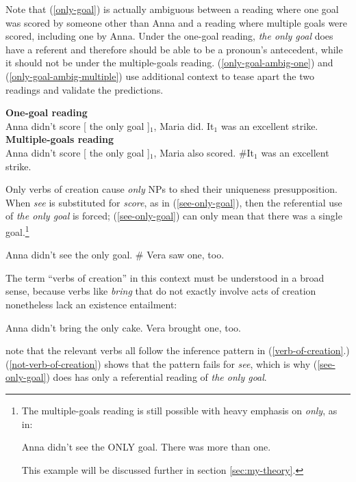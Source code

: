 Note that (\ref{only-goal}) is actually ambiguous between a reading where one goal was scored by someone other than Anna and a reading where multiple goals were scored, including one by Anna. Under the one-goal reading, \textit{the only goal} does have a referent and therefore should be able to be a pronoun's antecedent, while it should not be under the multiple-goals reading. (\ref{only-goal-ambig-one}) and (\ref{only-goal-ambig-multiple}) use additional context to tease apart the two readings and validate the predictions.

\begin{exe}
	\ex \label{only-goal-ambig-one} \textbf{One-goal reading} \\ Anna didn't score [ the only goal ]$_1$, Maria did. It$_1$ was an excellent strike.
	\ex \label{only-goal-ambig-multiple} \textbf{Multiple-goals reading} \\ Anna didn't score [ the only goal ]$_1$, Maria also scored. \#It$_1$ was an excellent strike.
\end{exe}

Only verbs of creation cause \textit{only} NPs to shed their uniqueness presupposition. When \textit{see} is substituted for \textit{score}, as in (\ref{see-only-goal}), then the referential use of \textit{the only goal} is forced; (\ref{see-only-goal}) can only mean that there was a single goal.\footnote{The multiple-goals reading is still possible with heavy emphasis on \textit{only}, as in: \begin{exe} \ex Anna didn't see the ONLY goal. There was more than one. \end{exe} This example will be discussed further in section \ref{sec:my-theory}.}

\begin{exe}
	\ex \label{see-only-goal} Anna didn't see the only goal. \# Vera saw one, too.
\end{exe}

The term ``verbs of creation'' in this context must be understood in a broad sense, because verbs like \textit{bring} that do not exactly involve acts of creation nonetheless lack an existence entailment:

\begin{exe}
	\ex Anna didn't bring the only cake. Vera brought one, too.
\end{exe}

\citet{cb2015} note that the relevant verbs all follow the inference pattern in (\ref{verb-of-creation}.) (\ref{not-verb-of-creation}) shows that the pattern fails for \textit{see}, which is why (\ref{see-only-goal}) does has only a referential reading of \textit{the only goal}.


